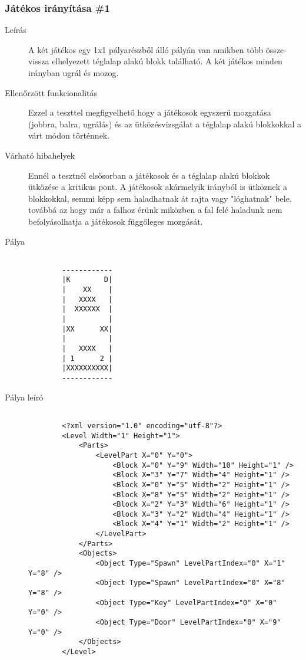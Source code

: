 \subsubsection{Játékos irányítása \#1}
\begin{description}
	
	\item[Leírás] A két játékos egy 1x1 pályarészből álló pályán van amikben több össze-vissza elhelyezett téglalap alakú blokk található. A két játékos minden irányban ugrál és mozog.
	
	\item[Ellenőrzött funkcionalitás] Ezzel a teszttel megfigyelhető hogy a játékosok egyszerű mozgatása (jobbra, balra, ugrálás) és az ütközésvizsgálat a téglalap alakú blokkokkal a várt módon történnek.
	
	\item[Várható hibahelyek] Ennél a tesztnél elsősorban a játékosok és a téglalap alakú blokkok ütközése a kritikus pont. A játékosok akármelyik irányból is ütköznek a blokkokkal, semmi képp sem haladhatnak át rajta vagy "lóghatnak" bele, továbbá az hogy már a falhoz érünk miközben a fal felé haladunk nem befolyásolhatja a játékosok függőleges mozgását.

	\item[Pálya]
	\begin{verbatim}
	
		------------
		|K        D|
		|    XX    |
		|   XXXX   |
		|  XXXXXX  |
		|          |
		|XX      XX|
		|          |
		|   XXXX   |
		| 1      2 |
		|XXXXXXXXXX|
		------------	
	\end{verbatim}

	\item[Pálya leíró]
	\begin{verbatim}
	
		<?xml version="1.0" encoding="utf-8"?>
		<Level Width="1" Height="1">
		    <Parts>
		        <LevelPart X="0" Y="0">
		            <Block X="0" Y="9" Width="10" Height="1" />
		            <Block X="3" Y="7" Width="4" Height="1" />
		            <Block X="0" Y="5" Width="2" Height="1" />
		            <Block X="8" Y="5" Width="2" Height="1" />
		            <Block X="2" Y="3" Width="6" Height="1" />
		            <Block X="3" Y="2" Width="4" Height="1" />
		            <Block X="4" Y="1" Width="2" Height="1" />
		        </LevelPart>
		    </Parts>
		    <Objects>
		        <Object Type="Spawn" LevelPartIndex="0" X="1" Y="8" />
		        <Object Type="Spawn" LevelPartIndex="0" X="8" Y="8" />
		        <Object Type="Key" LevelPartIndex="0" X="0" Y="0" />
		        <Object Type="Door" LevelPartIndex="0" X="9" Y="0" />
		    </Objects>
		</Level>
	\end{verbatim}
	

\end{description}
